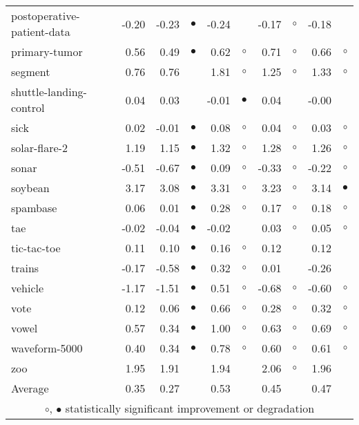 {\begin{longtable}{lrr@{\hspace{0.1cm}}cr@{\hspace{0.1cm}}cr@{\hspace{0.1cm}}cr@{\hspace{0.1cm}}c}
postoperative-patient-data & -0.20 & -0.23 & $\bullet$ & -0.24 &           & -0.17 &   $\circ$ & -0.18 &          \\
primary-tumor &  0.56 &  0.49 & $\bullet$ &  0.62 &   $\circ$ &  0.71 &   $\circ$ &  0.66 &   $\circ$\\
segment &  0.76 &  0.76 &           &  1.81 &   $\circ$ &  1.25 &   $\circ$ &  1.33 &   $\circ$\\
shuttle-landing-control &  0.04 &  0.03 &           & -0.01 & $\bullet$ &  0.04 &           & -0.00 &          \\
sick &  0.02 & -0.01 & $\bullet$ &  0.08 &   $\circ$ &  0.04 &   $\circ$ &  0.03 &   $\circ$\\
solar-flare-2 &  1.19 &  1.15 & $\bullet$ &  1.32 &   $\circ$ &  1.28 &   $\circ$ &  1.26 &   $\circ$\\
sonar & -0.51 & -0.67 & $\bullet$ &  0.09 &   $\circ$ & -0.33 &   $\circ$ & -0.22 &   $\circ$\\
soybean &  3.17 &  3.08 & $\bullet$ &  3.31 &   $\circ$ &  3.23 &   $\circ$ &  3.14 & $\bullet$\\
spambase &  0.06 &  0.01 & $\bullet$ &  0.28 &   $\circ$ &  0.17 &   $\circ$ &  0.18 &   $\circ$\\
tae & -0.02 & -0.04 & $\bullet$ & -0.02 &           &  0.03 &   $\circ$ &  0.05 &   $\circ$\\
tic-tac-toe &  0.11 &  0.10 & $\bullet$ &  0.16 &   $\circ$ &  0.12 &           &  0.12 &          \\
trains & -0.17 & -0.58 & $\bullet$ &  0.32 &   $\circ$ &  0.01 &           & -0.26 &          \\
vehicle & -1.17 & -1.51 & $\bullet$ &  0.51 &   $\circ$ & -0.68 &   $\circ$ & -0.60 &   $\circ$\\
vote &  0.12 &  0.06 & $\bullet$ &  0.66 &   $\circ$ &  0.28 &   $\circ$ &  0.32 &   $\circ$\\
vowel &  0.57 &  0.34 & $\bullet$ &  1.00 &   $\circ$ &  0.63 &   $\circ$ &  0.69 &   $\circ$\\
waveform-5000 &  0.40 &  0.34 & $\bullet$ &  0.78 &   $\circ$ &  0.60 &   $\circ$ &  0.61 &   $\circ$\\
zoo &  1.95 &  1.91 &           &  1.94 &           &  2.06 &   $\circ$ &  1.96 &          \\
\hline
Average &  0.35 &  0.27 &           &  0.53 &           &  0.45 &           &  0.47 &          \\
\hline
\multicolumn{10}{c}{$\circ$, $\bullet$ statistically significant improvement or degradation}\\
\end{longtable} \footnotesize \par}
